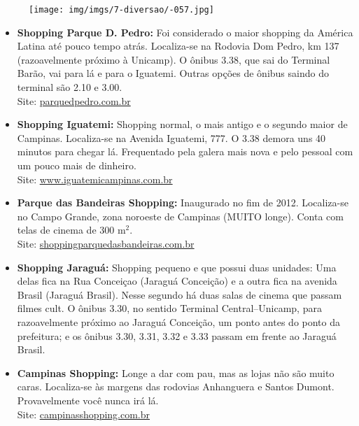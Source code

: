 \begin{figure}[h!]
    \centering
    \texttt{[image: img/imgs/7-diversao/-057.jpg]}
\end{figure}

\begin{itemize}

\item   \textbf{Shopping Parque D. Pedro:} Foi considerado o maior shopping da
        América Latina até pouco tempo atrás. Localiza-se na Rodovia Dom Pedro,
        km 137 (razoavelmente próximo à Unicamp). O ônibus 3.38, que sai do
        Terminal Barão, vai para lá e para o Iguatemi. Outras opções de ônibus
        saindo do terminal são 2.10 e 3.00.
        \\Site: \url{parquedpedro.com.br}

\item   \textbf{Shopping Iguatemi:} Shopping normal, o mais antigo e o segundo
        maior de Campinas. Localiza-se na Avenida Iguatemi, 777. O 3.38 demora
        uns 40 minutos para chegar lá. Frequentado pela galera mais nova e pelo
        pessoal com um pouco mais de dinheiro.
        \\Site: \url{www.iguatemicampinas.com.br}

\item   \textbf{Parque das Bandeiras Shopping:} Inaugurado no fim de 2012.
        Localiza-se no Campo Grande, zona noroeste de Campinas (MUITO longe). Conta com
        telas de cinema de 300 m$^{2}$.
        \\Site: \url{shoppingparquedasbandeiras.com.br}

\item   \textbf{Shopping Jaraguá:} Shopping pequeno e que possui duas unidades:
        Uma delas fica na Rua Conceiçao (Jaraguá Conceição) e a outra fica na
        avenida Brasil (Jaraguá Brasil). Nesse segundo há duas salas de cinema
        que passam filmes cult. O ônibus 3.30, no sentido Terminal
        Central--Unicamp, para razoavelmente próximo ao Jaraguá Conceição, um
        ponto antes do ponto da prefeitura; e os ônibus 3.30, 3.31, 3.32 e 3.33
        passam em frente ao Jaraguá Brasil.

\item   \textbf{Campinas Shopping:} Longe a dar com pau, mas as lojas não são
        muito caras. Localiza-se às margens das rodovias Anhanguera e Santos
        Dumont. Provavelmente você nunca irá lá.
        \\Site: \url{campinasshopping.com.br}


\end{itemize}
